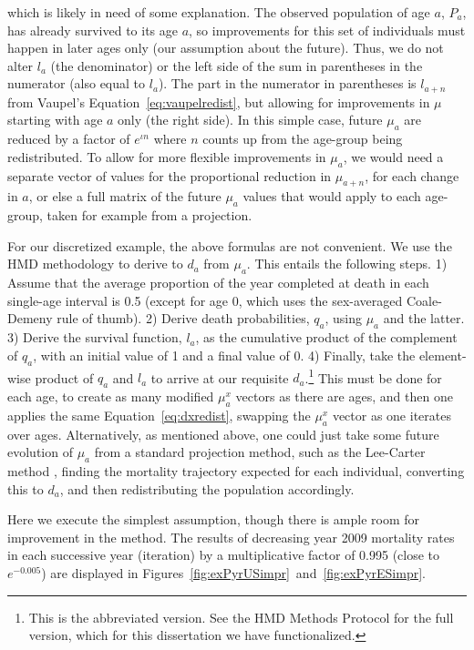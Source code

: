 which is likely in need of some explanation. The observed population of age $a$,
$P_a$, has already survived to its age $a$, so improvements for this set of
individuals must happen in later ages only (our assumption about the future).
Thus, we do not alter $l_a$ (the denominator) or the left side of the sum in
parentheses in the numerator (also equal to $l_a$). The part in the numerator in
parentheses is $l_{a+n}$ from Vaupel's Equation~\eqref{eq:vaupelredist}, but allowing
for improvements in $\mu$ starting with age $a$ only (the right side). In this
simple case, future $\mu_a$ are reduced by a factor of $e^{\iota n}$ where 
$n$ counts up from the age-group being redistributed. To allow for more flexible
improvements in $\mu_a$, we would need a separate vector of values for the
proportional reduction in $\mu_{a+n}$, for each change in $a$, or else a full
matrix of the future $\mu_a$ values that would apply to each age-group, taken
for example from a projection.

For our discretized example, the above formulas are not convenient. We use the
HMD methodology to derive to $d_a$ from $\mu_a$. This entails the following
steps. 1) Assume that the average proportion of the year completed at death in
each single-age interval is 0.5 (except for age 0, which uses the
sex-averaged Coale-Demeny rule of thumb). 2) Derive death probabilities, $q_a$,
using $\mu_a$ and the latter. 3) Derive the survival function, $l_a$, as the cumulative product of
the complement of $q_a$, with an initial value of 1 and a final value of 0. 4)
Finally, take the element-wise product of $q_a$ and $l_a$ to arrive at our
requisite $d_a$.\footnote{This is the abbreviated version. See the HMD Methods
Protocol \citep{wilmoth2007methods} for the full version, which for this
dissertation we have functionalized.} This must be done for each age, to create as many modified $\mu _a^x $ vectors as there 
are ages, and then one applies the same Equation~\eqref{eq:dxredist}, swapping
the $\mu _a^x$ vector as one iterates over ages. Alternatively, as mentioned above,
one could just take some future evolution of $\mu_a$ from a standard projection method, such as the Lee-Carter method
\citep{lee1992modeling}, finding the mortality trajectory expected for each individual, converting
this to $d_a$, and then redistributing the population accordingly. 

Here we execute the simplest assumption, though there is ample room for
improvement in the method. The results of decreasing year 2009 mortality rates
in each successive year (iteration) by a multiplicative factor of 0.995 (close to
$e^{-0.005}$) are displayed in
Figures~\ref{fig:exPyrUSimpr}~and~\ref{fig:exPyrESimpr}.

